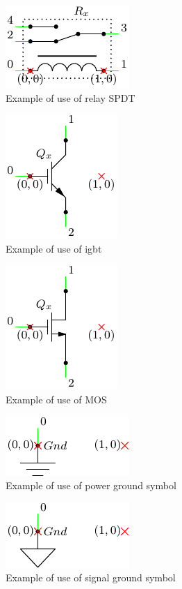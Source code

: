 \documentclass[a4paper,12pt]{report}
\begin{document}
\begin{figure}[h]
\centering
\includegraphics{relaySPDTInfo}
\caption{Example of use of relay SPDT}
\label{relaySPDTInfo} %
\end{figure}

\begin{figure}[h]
\centering
\includegraphics{igbtInfo}
\caption{Example of use of igbt}
\label{igbtrInfo} %
\end{figure}

\begin{figure}[h]
\centering
\includegraphics{mosInfo}
\caption{Example of use of MOS}
\label{mosInfo} %
\end{figure}

\begin{figure}[h]
\centering
\includegraphics{gndPowerInfo}
\caption{Example of use of power ground symbol}
\label{gndPowerInfo} %
\end{figure}

\begin{figure}[h]
\centering
\includegraphics{gndSignalInfo}
\caption{Example of use of signal ground symbol}
\label{gndSignalInfo} %
\end{figure}
\end{document}
